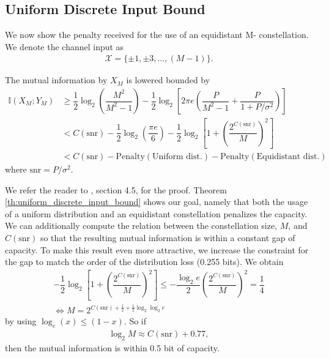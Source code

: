 \subsection{Uniform Discrete Input Bound}
We now show the penalty received for the use of an equidistant M- constellation. We denote the channel input as
\begin{align}
	\mathcal{X} = \{\pm1, \pm 3,\dots, (M-1)\}.
\end{align}
\begin{theorem}
\label{th:uniform_discrete_input_bound}
The mutual information by $X_M$ is lowered bounded by
\begin{align}
\mathbb{I}(X_M;Y_M) &\geq \dfrac{1}{2} \log_2 \left( \dfrac{M^2}{M^2 -1}\right) - \dfrac{1}{2} \log_2 \left[2\pi e\left( \dfrac{P}{M^2 -1}+ \dfrac{P}{1+P/\sigma^2}\right)\right]\\
& < C(\text{snr}) - \dfrac{1}{2} \log_{2} \left(\dfrac{\pi e}{6}\right) - \dfrac{1}{2} \log_2 \left[1 +\left(\dfrac{2^{C(\text{snr})}}{M}\right)^2\right]\\
& < C(\text{snr}) - \text{Penalty}(\text{Uniform dist.}) - \text{Penalty}(\text{Equidistant dist.})
\end{align}
where $\text{snr} = P/\sigma^2$.
\end{theorem}
We refer the reader to \cite{Boecherer_CM}, section 4.5, for the proof.
Theorem \ref{th:uniform_discrete_input_bound} shows our goal, namely that both the usage of a uniform distribution and an equidistant constellation penalizes the capacity. We can additionally compute the relation between the constellation size, $M$, and $C(\text{snr})$ so that the resulting mutual information is within a constant gap of capacity. To make this result even more attractive, we increase the constraint for the gap to match the order of the distribution loss (0.255 bits). We obtain
\begin{align}
	- \dfrac{1}{2} \log_2 \left[1 +\left(\dfrac{2^{C(\text{snr})}}{M}\right)^2\right] \leq - \dfrac{\log_2 e}{2} \left(\dfrac{2^{C(\text{snr})}}{M}\right)^2 = \dfrac{1}{4}\\
	\Leftrightarrow M = 2^{C(\text{snr}) + \tfrac{1}{2}+\tfrac{1}{2} \log_2 \log_2 e}
\end{align}
by using $\log_e(x)\leq (1-x)$. So if 
\begin{align}
	\log_2 M \approx C(\text{snr}) +0.77,
\end{align}
then the mutual information is within 0.5 bit of capacity.

